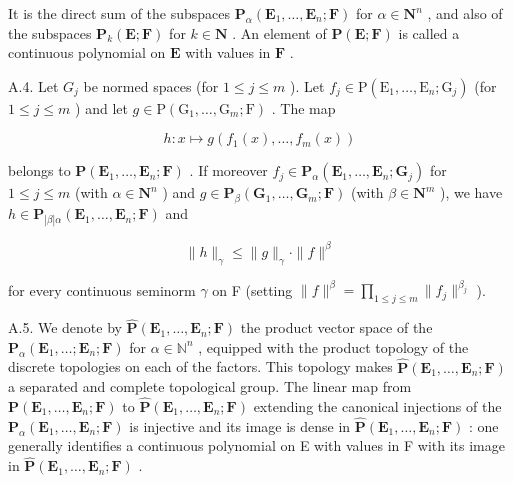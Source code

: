 It is the direct sum of the subspaces \(\mathbf{P}_{\alpha}(\mathbf{E}_{1},\ldots,\mathbf{E}_{n};\mathbf{F})\) for \(\alpha\in\mathbf{N}^{n}\) , and also of the subspaces \(\mathbf{P}_{k}(\mathbf{E};\mathbf{F})\) for \(k\in\mathbf{N}\) . An element of \(\mathbf{P}(\mathbf{E};\mathbf{F})\) is called a continuous polynomial on \(\mathbf{E}\) with values in \(\mathbf{F}\) .

A.4. Let \(G_{j}\) be normed spaces (for \(1 \leqslant j \leqslant m\) ). Let \(f_{j} \in \mathrm{P}(\mathrm{E}_{1}, \ldots, \mathrm{E}_{n}; \mathrm{G}_{j})\) (for \(1 \leqslant j \leqslant m\) ) and let \(g \in \mathrm{P}(\mathrm{G}_{1}, \ldots, \mathrm{G}_{m}; \mathrm{F})\) . The map

\[
h: x \mapsto g (f _ {1} (x), \dots , f _ {m} (x))
\]

belongs to \(\mathbf{P}(\mathbf{E}_1,\ldots ,\mathbf{E}_n;\mathbf{F})\) . If moreover \(f_{j}\in \mathbf{P}_{\alpha}(\mathbf{E}_{1},\ldots ,\mathbf{E}_{n};\mathbf{G}_{j})\) for \(1\leqslant j\leqslant m\) (with \(\alpha \in \mathbf{N}^n\) ) and \(g\in \mathbf{P}_{\beta}(\mathbf{G}_1,\ldots ,\mathbf{G}_m;\mathbf{F})\) (with \(\beta \in \mathbf{N}^{m}\) ), we have \(h\in \mathbf{P}_{|\beta |\alpha}(\mathbf{E}_1,\ldots ,\mathbf{E}_n;\mathbf{F})\) and

\[
\| h \| _ {\gamma} \leqslant \| g \| _ {\gamma} \cdot \| f \| ^ {\beta}
\]

for every continuous seminorm \(\gamma\) on F (setting \(\| f\|^{\beta} = \prod_{1 \leqslant j \leqslant m} \| f_j \|^{\beta_j}\) ).

A.5. We denote by \(\hat{\mathbf{P}}(\mathbf{E}_{1},\ldots,\mathbf{E}_{n};\mathbf{F})\) the product vector space of the \(\mathbf{P}_{\alpha}(\mathbf{E}_{1},\ldots;\mathbf{E}_{n};\mathbf{F})\) for \(\alpha\in\mathbb{N}^{n}\) , equipped with the product topology of the discrete topologies on each of the factors. This topology makes \(\hat{\mathbf{P}}(\mathbf{E}_{1},\ldots,\mathbf{E}_{n};\mathbf{F})\) a separated and complete topological group. The linear map from \(\mathbf{P}(\mathbf{E}_{1},\ldots,\mathbf{E}_{n};\mathbf{F})\) to \(\hat{\mathbf{P}}(\mathbf{E}_{1},\ldots,\mathbf{E}_{n};\mathbf{F})\) extending the canonical injections of the \(\mathbf{P}_{\alpha}(\mathbf{E}_{1},\ldots,\mathbf{E}_{n};\mathbf{F})\) is injective and its image is dense in \(\hat{\mathbf{P}}(\mathbf{E}_{1},\ldots,\mathbf{E}_{n};\mathbf{F})\) : one generally identifies a continuous polynomial on E with values in F with its image in \(\hat{\mathbf{P}}(\mathbf{E}_{1},\ldots,\mathbf{E}_{n};\mathbf{F})\) .

